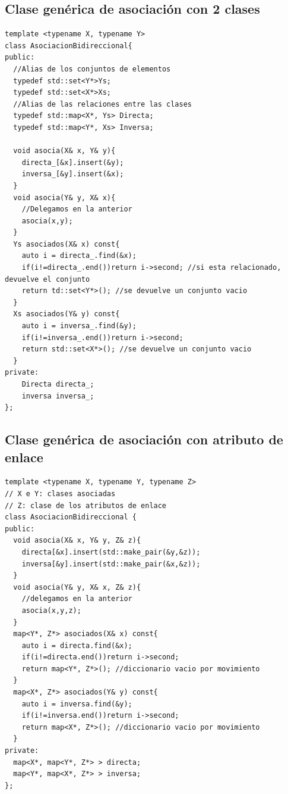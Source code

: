 \subsection{Clase genérica de asociación con 2 clases}
\begin{center}
	\begin{lstlisting}[frame=single]
template <typename X, typename Y>
class AsociacionBidireccional{
public:
  //Alias de los conjuntos de elementos
  typedef std::set<Y*>Ys;
  typedef std::set<X*>Xs;
  //Alias de las relaciones entre las clases
  typedef std::map<X*, Ys> Directa;
  typedef std::map<Y*, Xs> Inversa;

  void asocia(X& x, Y& y){
    directa_[&x].insert(&y);
    inversa_[&y].insert(&x);
  }
  void asocia(Y& y, X& x){
    //Delegamos en la anterior
    asocia(x,y);
  }
  Ys asociados(X& x) const{
    auto i = directa_.find(&x);
    if(i!=directa_.end())return i->second; //si esta relacionado, devuelve el conjunto
    return td::set<Y*>(); //se devuelve un conjunto vacio
  }
  Xs asociados(Y& y) const{
    auto i = inversa_.find(&y);
    if(i!=inversa_.end())return i->second;
    return std::set<X*>(); //se devuelve un conjunto vacio
  }
private:
    Directa directa_;
    inversa inversa_;
};
\end{lstlisting}
\end{center}
\newpage
\subsection{Clase genérica de asociación con atributo de enlace}
\begin{center}
	\begin{lstlisting}[frame=single]
template <typename X, typename Y, typename Z> 
// X e Y: clases asociadas
// Z: clase de los atributos de enlace
class AsociacionBidireccional {
public:
  void asocia(X& x, Y& y, Z& z){
    directa[&x].insert(std::make_pair(&y,&z));
    inversa[&y].insert(std::make_pair(&x,&z));
  }
  void asocia(Y& y, X& x, Z& z){
    //delegamos en la anterior
    asocia(x,y,z);
  }
  map<Y*, Z*> asociados(X& x) const{
    auto i = directa.find(&x);
    if(i!=directa.end())return i->second;
    return map<Y*, Z*>(); //diccionario vacio por movimiento
  }
  map<X*, Z*> asociados(Y& y) const{
    auto i = inversa.find(&y);
    if(i!=inversa.end())return i->second;
    return map<X*, Z*>(); //diccionario vacio por movimiento
  }
private:
  map<X*, map<Y*, Z*> > directa;
  map<Y*, map<X*, Z*> > inversa;
};
\end{lstlisting}
\end{center}